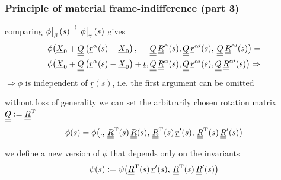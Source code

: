 \begin{frame}
  \frametitle{Principle of material frame-indifference (part 3)}
  
  comparing $\eval[1]{\phi}_{\beta}(s) \overset{!}{=} \eval[1]{\phi}_{\gamma}(s)$ gives
  \begin{displaymath}
    \begin{alignedat}{4}
      \phi \bigl(
        &\underline{X}_0 + \underline{\underline{Q}} \left( \underline{r}^{\alpha}(s) - \underline{X}_0 \right) , \,
        &\underline{\underline{Q}} \, \underline{\underline{R}}^{\alpha}(s) , \,
        &\underline{\underline{Q}} \, \underline{r}^{\alpha \prime}(s) , \,
        &\underline{\underline{Q}} \, \underline{\underline{R}}^{\alpha \prime}(s)
      \bigr) = \\
      \phi \bigl(
        &\underline{X}_0 + \underline{\underline{Q}} \left( \underline{r}^{\alpha}(s) - \underline{X}_0 \right) + \underline{t} , \,
        &\underline{\underline{Q}} \, \underline{\underline{R}}^{\alpha}(s) , \,
        &\underline{\underline{Q}} \, \underline{r}^{\alpha \prime}(s) , \,
        &\underline{\underline{Q}} \, \underline{\underline{R}}^{\alpha \prime}(s)
      \bigr) \Rightarrow
    \end{alignedat}
  \end{displaymath}
  $\Rightarrow \phi$ is independent of $\underline{r}(s)$, i.e. the first argument can be omitted
  
  \vspace{1em}
  without loss of generality we can set the arbitrarily chosen rotation matrix $\underline{\underline{Q}} := \underline{\underline{R}}^{\mathrm{T}}$
  \begin{displaymath}
    \phi(s) = \phi \bigl(
        . , \,
        \underline{\underline{R}}^{\mathrm{T}}(s) \, \underline{\underline{R}}(s) , \,
        \underline{\underline{R}}^{\mathrm{T}}(s) \, \underline{r}^{\prime}(s) , \,
        \underline{\underline{R}}^{\mathrm{T}}(s) \, \underline{\underline{R}}^{\prime}(s)
      \bigr)
  \end{displaymath}
  
  \vspace{1em}
  we define a new version of $\phi$ that depends only on the invariants
  \begin{displaymath}
    \psi(s) := \psi \bigl(
      \underline{\underline{R}}^{\mathrm{T}}(s) \, \underline{r}^{\prime}(s) , \,
      \underline{\underline{R}}^{\mathrm{T}}(s) \, \underline{\underline{R}}^{\prime}(s)
    \bigr)
  \end{displaymath}  
\end{frame}


